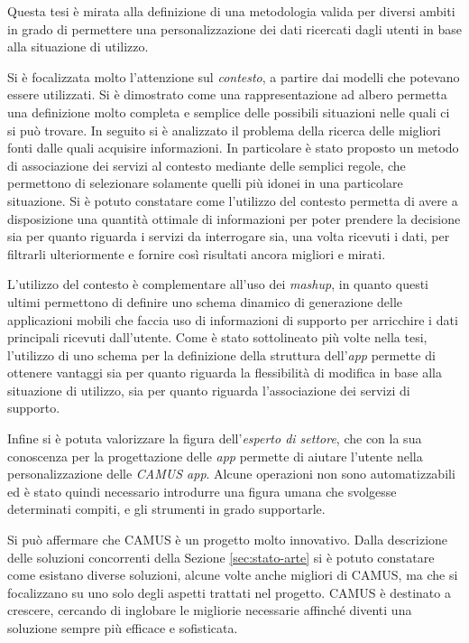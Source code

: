 Questa tesi è mirata alla definizione di una metodologia valida per diversi ambiti in grado di permettere una personalizzazione dei dati ricercati dagli utenti in base alla situazione di utilizzo.

Si è focalizzata molto l'attenzione sul \emph{contesto}, a partire dai modelli che potevano essere utilizzati. Si è dimostrato come una rappresentazione ad albero permetta una definizione molto completa e semplice delle possibili situazioni nelle quali ci si può trovare. In seguito si è analizzato il problema della ricerca delle migliori fonti dalle quali acquisire informazioni. In particolare è stato proposto un metodo di associazione dei servizi al contesto mediante delle semplici regole, che permettono di selezionare solamente quelli più idonei in una particolare situazione. Si è potuto constatare come l'utilizzo del contesto permetta di avere a disposizione una quantità ottimale di informazioni per poter prendere la decisione sia per quanto riguarda i servizi da interrogare sia, una volta ricevuti i dati, per filtrarli ulteriormente e fornire così risultati ancora migliori e mirati.

L'utilizzo del contesto è complementare all'uso dei \emph{mashup}, in quanto questi ultimi permettono di definire uno schema dinamico di generazione delle applicazioni mobili che faccia uso di informazioni di supporto per arricchire i dati principali ricevuti dall'utente. Come è stato sottolineato più volte nella tesi, l'utilizzo di uno schema per la definizione della struttura dell'\emph{app} permette di ottenere vantaggi sia per quanto riguarda la flessibilità di modifica in base alla situazione di utilizzo, sia per quanto riguarda l'associazione dei servizi di supporto.

Infine si è potuta valorizzare la figura dell'\emph{esperto di settore}, che con la sua conoscenza per la progettazione delle \emph{app} permette di aiutare l'utente nella personalizzazione delle \emph{CAMUS app}. Alcune operazioni non sono automatizzabili ed è stato quindi necessario introdurre una figura umana che svolgesse determinati compiti, e gli strumenti in grado supportarle.

Si può affermare che CAMUS è un progetto molto innovativo. Dalla descrizione delle soluzioni concorrenti della Sezione \ref{sec:stato-arte} si è potuto constatare come esistano diverse soluzioni, alcune volte anche migliori di CAMUS, ma che si focalizzano su uno solo degli aspetti trattati nel progetto. CAMUS è destinato a crescere, cercando di inglobare le migliorie necessarie affinché diventi una soluzione sempre più efficace e sofisticata.

